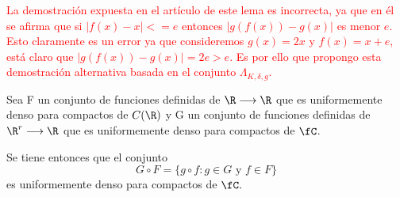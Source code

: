 \textcolor{red}{La demostración expuesta en el artículo de este lema es incorrecta, ya que en él se afirma que 
si $|f(x) - x| <= e$ entonces $|g(f(x))- g(x)|$ es menor $e$. Esto claramente es un error ya que 
consideremos $g(x) = 2x$ y $f(x)=x+e$, está claro que $|g(f(x))- g(x)|=2e>e$. Es por ello que propongo esta
demostración alternativa basada en el conjunto $\Lambda_{K, \delta, g}$.}
\begin{lema}
    Sea F un conjunto de funciones definidas de $\R \longrightarrow \R$ que es uniformemente 
    denso para compactos de $C(\R)$ y
    G un conjunto de funciones definidas de $\R^r \longrightarrow \R$ que es uniformemente 
    denso para compactos de $\fC$.
    
    Se tiene entonces que el conjunto 
    \begin{equation}
        G \circ F 
        = 
        \{
            g \circ f : g \in G \text{ y } f \in F
        \}
    \end{equation}
    es uniformemente denso para compactos de $\fC.$
\end{lema}
